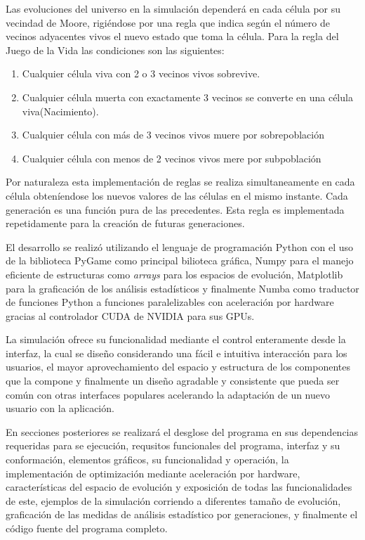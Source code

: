 \documentclass[]{article}
\begin{document}
	Las evoluciones del universo en la simulación dependerá en cada célula por su vecindad de Moore, rigiéndose por una regla que indica según el número de vecinos adyacentes vivos el nuevo estado que toma la célula. Para la regla del Juego de la Vida las condiciones son las siguientes:
	\begin{enumerate}
		\item Cualquier célula viva con 2 o 3 vecinos vivos sobrevive.
		\item Cualquier célula muerta con exactamente 3 vecinos se converte en una célula viva(Nacimiento).
		\item Cualquier célula con más de 3 vecinos vivos muere por sobrepoblación
		\item Cualquier célula con menos de 2 vecinos vivos mere por subpoblación
	\end{enumerate}
	Por naturaleza esta implementación de reglas se realiza simultaneamente en cada célula obteníendose los nuevos valores de las células en el mismo instante. Cada generación es una función pura de las precedentes. Esta regla es implementada repetidamente para la creación de futuras generaciones.
	
	El desarrollo se realizó utilizando el lenguaje de programación Python con el uso de la biblioteca PyGame como principal bilioteca gráfica, Numpy para el manejo eficiente de estructuras como \textit{arrays} para los espacios de evolución, Matplotlib para la graficación de los análisis estadísticos y finalmente Numba como traductor de funciones Python a funciones paralelizables con aceleración por hardware gracias al controlador CUDA de NVIDIA para sus GPUs.
	
	La simulación ofrece su funcionalidad mediante el control enteramente desde la interfaz, la cual se diseño considerando una fácil e intuitiva interacción para los usuarios, el mayor aprovechamiento del espacio y estructura de los componentes que la compone y finalmente un diseño agradable y consistente que pueda ser común con otras interfaces populares acelerando la adaptación de un nuevo usuario con la aplicación.
	
	En secciones posteriores se realizará el desglose del programa en sus dependencias requeridas para se ejecución, requsitos funcionales del programa, interfaz y su conformación, elementos gráficos, su funcionalidad y operación, la implementación de optimización mediante aceleración por hardware, características del espacio de evolución y exposición de todas las funcionalidades de este, ejemplos de la simulación corriendo a diferentes tamaño de evolución, graficación de las medidas de análisis estadístico por generaciones, y finalmente el código fuente del programa completo.
	
\end{document}
